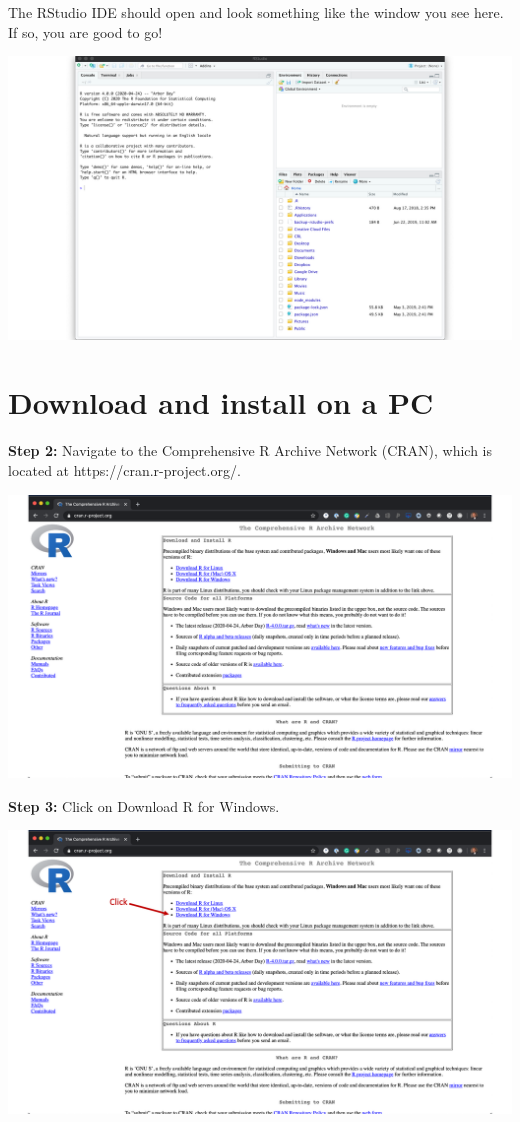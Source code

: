 \documentclass[
  letterpaper,
  DIV=11,
  numbers=noendperiod]{scrreprt}
\begin{document}
The RStudio IDE should open and look something like the window you see
here. If so, you are good to go! 🎉

\includegraphics{chapters/installing_r_and_rstudio/mac_view_rstudio.png}

\section{Download and install on a
PC}\label{download-and-install-on-a-pc}

\textbf{Step 2:} Navigate to the Comprehensive R Archive Network (CRAN),
which is located at https://cran.r-project.org/.

\includegraphics{chapters/installing_r_and_rstudio/pc_cran.png}

\textbf{Step 3:} Click on Download R for Windows.

\includegraphics{chapters/installing_r_and_rstudio/pc_download_r1.png}
\end{document}
